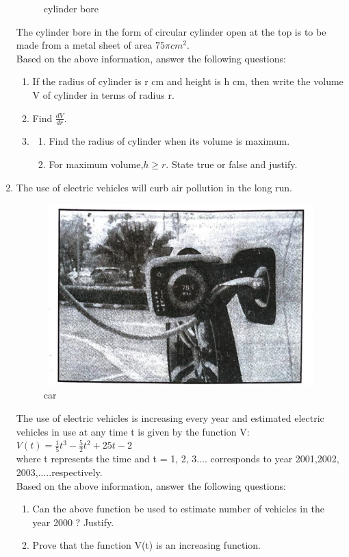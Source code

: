 \begin{enumerate}
\begin{figure}[h!]
\caption{cylinder bore}
\label{fig:fig1}
\end{figure}
The cylinder bore in the form of circular cylinder open at the top is to be made from a metal sheet of area $75\pi cm^2$.\\Based on the above information, answer the following questions:
		  \begin{enumerate}
			  \item If the radius of cylinder is r cm and height is h cm, then write the volume V of cylinder in terms of radius r.
			  \item Find $\frac{dV}{dr}.$
			  \item \begin{enumerate}

					  \item Find the radius  of cylinder when its volume is maximum.
					  \item For maximum volume,$ h \ge r.$ State true or false and justify.
			  \end{enumerate}
		  \end{enumerate}
	  \item The use of electric vehicles will curb air pollution in the long run.
		\begin{figure}[h!]
		\centering
		  \includegraphics[height=7cm,width=11cm]{./figs/q3.png}
\caption{car}
\end{figure}
		  The use of electric vehicles is increasing every year and estimated electric vehicles in use at any time t is given by the function V:\\
	 \quad $V(t) = \frac{1}{5}t^3 - \frac{5}{2}t^2 + 25t - 2 $\\where t represents the time and t = 1, 2, 3.... corresponds to year 2001,2002, 2003,.....respectively.\\Based on the above information, answer the following questions:
		  \begin{enumerate}
			  \item Can the above function be used to estimate number of vehicles in the year 2000 ? Justify.
			  \item Prove that the function V(t) is an increasing function.
		  \end{enumerate}

 \end{enumerate}
